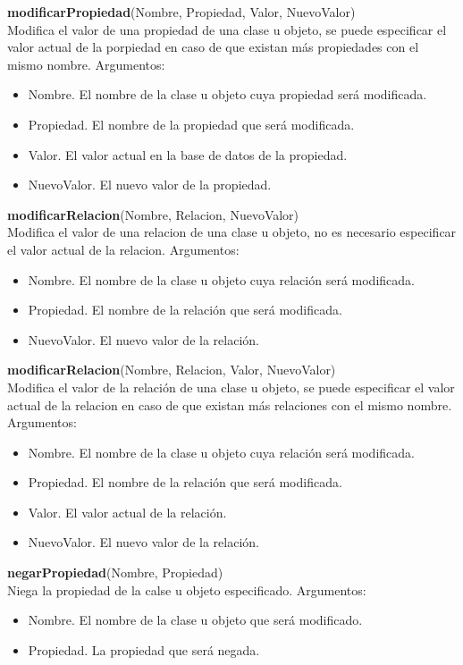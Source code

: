 \documentclass[11pt]{article}
\newcommand{\comando}[2]{
    \textbf{#1}(#2)\\
}
\newenvironment{args}{
    \newline
    Argumentos:
    \begin{itemize}
}{
    \end{itemize}
    \bigskip
}
\begin{document}
\comando{modificarPropiedad}{Nombre, Propiedad, Valor, NuevoValor}
Modifica el valor de una propiedad de una clase u objeto, se puede especificar el valor actual de la porpiedad en caso de que existan más propiedades con el mismo nombre.
\begin{args}
\item Nombre. El nombre de la clase u objeto cuya propiedad será modificada.
\item Propiedad. El nombre de la propiedad que será modificada.
\item Valor. El valor actual en la base de datos de la propiedad.
\item NuevoValor. El nuevo valor de la propiedad.
\end{args}

\comando{modificarRelacion}{Nombre, Relacion, NuevoValor}
Modifica el valor de una relacion de una clase u objeto, no es necesario especificar el valor actual de la relacion.
\begin{args}
\item Nombre. El nombre de la clase u objeto cuya relación será modificada.
\item Propiedad. El nombre de la relación que será modificada.
\item NuevoValor. El nuevo valor de la relación.
\end{args}

\comando{modificarRelacion}{Nombre, Relacion, Valor, NuevoValor}
Modifica el valor de la relación de una clase u objeto, se puede especificar el valor actual de la relacion en caso de que existan más relaciones con el mismo nombre.
\begin{args}
\item Nombre. El nombre de la clase u objeto cuya relación será modificada.
\item Propiedad. El nombre de la relación que será modificada.
\item Valor. El valor actual de la relación.
\item NuevoValor. El nuevo valor de la relación.
\end{args}

\comando{negarPropiedad}{Nombre, Propiedad}
Niega la propiedad de la calse u objeto especificado.
\begin{args}
\item Nombre. El nombre de la clase u objeto que será modificado.
\item Propiedad. La propiedad que será negada.
\end{args}
\end{document}
